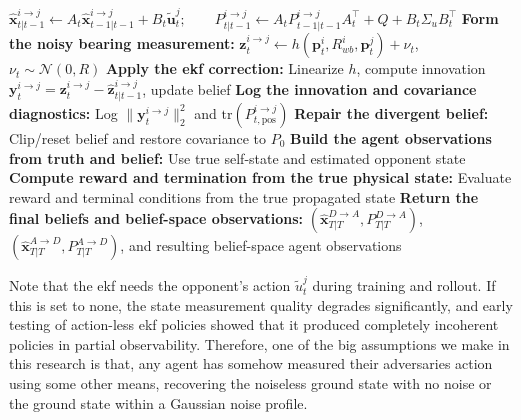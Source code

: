 \begin{algorithm}[H]
\begin{algorithmic}[1]
    \State \hspace{1em} $\hat{\mathbf{x}}_{t|t-1}^{i\to j}\leftarrow A_t\hat{\mathbf{x}}_{t-1|t-1}^{i\to j}+B_t\tilde{\mathbf{u}}_t^j;\qquad
P_{t|t-1}^{i\to j}\leftarrow A_t P_{t-1|t-1}^{i\to j} A_t^\top + Q + B_t\Sigma_u B_t^\top$
      \State \textbf{Form the noisy bearing measurement:}
      \State \hspace{1em} $\mathbf{z}^{i \to j}_t\leftarrow h(\mathbf{p}_t^i, R_{wb}^i, \mathbf{p}_t^j) + \nu_t$, $\nu_t\sim\mathcal{N}(0,R)$
      \State \textbf{Apply the \acs{ekf} correction:}
      \State \hspace{1em} Linearize $h$, compute innovation $\mathbf{y}^{i \to j}_t = \mathbf{z}^{i \to j}_t - \hat{\mathbf{z}}^{i \to j}_{t|t-1}$, update belief
      \State \textbf{Log the innovation and covariance diagnostics:}
      \State \hspace{1em} Log $\|\mathbf{y}_t^{i\to j}\|_2^2$ and $\mathrm{tr}(P^{i\to j}_{t,\mathrm{pos}})$
    \EndIf
      \State \textbf{Repair the divergent belief:}
      \State \hspace{1em} Clip/reset belief and restore covariance to $P_0$
    \EndIf
  \EndFor
  \State \textbf{Build the agent observations from truth and belief:}
  \State \hspace{1em} Use true self-state and estimated opponent state
  \State \textbf{Compute reward and termination from the true physical state:}
  \State \hspace{1em} Evaluate reward and terminal conditions from the true propagated state
\EndFor
\State \textbf{Return the final beliefs and belief-space observations:}
\State \hspace{1em} $(\hat{\mathbf{x}}^{D\to A}_{T|T},P^{D\to A}_{T|T})$, $(\hat{\mathbf{x}}^{A\to D}_{T|T},P^{A\to D}_{T|T})$, and resulting belief-space agent observations
\end{algorithmic}
\end{algorithm}

Note that the \acs{ekf} needs the opponent's action $\tilde{u}_t^j$ during training and rollout. If this is set to none, the state measurement quality degrades significantly, and early testing of action-less \acs{ekf} policies showed that it produced completely incoherent policies in partial observability. Therefore, one of the big assumptions we make in this research is that, any agent has somehow measured their adversaries action using some other means, recovering the noiseless ground state with no noise or the ground state within a Gaussian noise profile.


